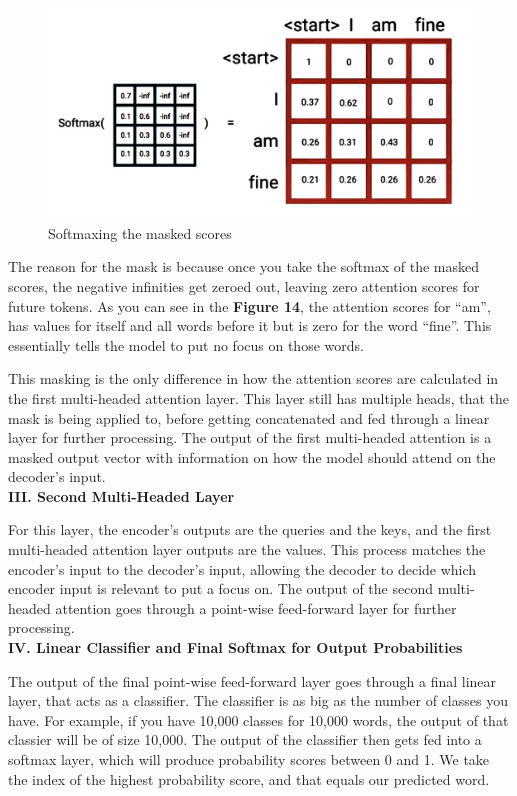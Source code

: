 \begin{figure}[H]
\centering
\includegraphics[width=.3\textwidth]{figures/t14.jpg}
\caption{Softmaxing the masked scores}
\end{figure}
\newpage


The reason for the mask is because once you take the softmax of the masked scores, the negative infinities get zeroed out, leaving zero attention scores for future tokens. As you can see in the \textbf{Figure 14}, the attention scores for “am”, has values for itself and all words before it but is zero for the word “fine”. This essentially tells the model to put no focus on those words.

This masking is the only difference in how the attention scores are calculated in the first multi-headed attention layer. This layer still has multiple heads, that the mask is being applied to, before getting concatenated and fed through a linear layer for further processing. The output of the first multi-headed attention is a masked output vector with information on how the model should attend on the decoder’s input. \\

\noindent
\textbf{III. Second Multi-Headed Layer}

For this layer, the encoder’s outputs are the queries and the keys, and the first multi-headed attention layer outputs are the values. This process matches the encoder’s input to the decoder’s input, allowing the decoder to decide which encoder input is relevant to put a focus on. The output of the second multi-headed attention goes through a point-wise feed-forward layer for further processing.\\

\noindent
\textbf{IV. Linear Classifier and Final Softmax for Output Probabilities}

The output of the final point-wise feed-forward layer goes through a final linear layer, that acts as a classifier. The classifier is as big as the number of classes you have. For example, if you have 10,000 classes for 10,000 words, the output of that classier will be of size 10,000. The output of the classifier then gets fed into a softmax layer, which will produce probability scores between 0 and 1. We take the index of the highest probability score, and that equals our predicted word.

